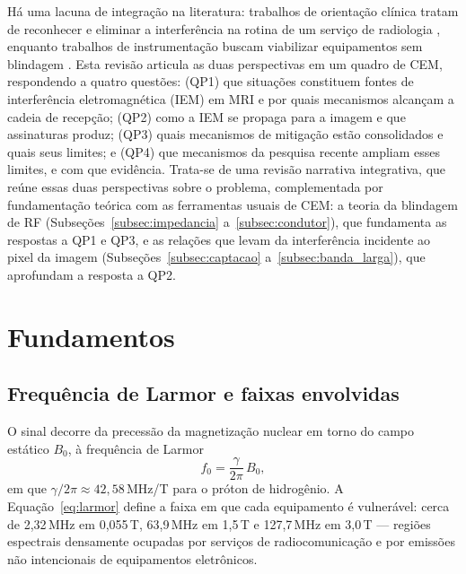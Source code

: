 \documentclass[portuguese]{sbcreviews-2025}%
\begin{document}
Há uma lacuna de integração na literatura: trabalhos de orientação clínica tratam de reconhecer e eliminar a interferência na rotina de um serviço de radiologia \citep{kwok2024rf}, enquanto trabalhos de instrumentação buscam viabilizar equipamentos sem blindagem \citep{zhao2024emi, srinivas2022editer}. Esta revisão articula as duas perspectivas em um quadro de CEM, respondendo a quatro questões: (QP1) que situações constituem fontes de interferência eletromagnética (IEM) em MRI e por quais mecanismos alcançam a cadeia de recepção; (QP2) como a IEM se propaga para a imagem e que assinaturas produz; (QP3) quais mecanismos de mitigação estão consolidados e quais seus limites; e (QP4) que mecanismos da pesquisa recente ampliam esses limites, e com que evidência. Trata-se de uma revisão narrativa integrativa, que reúne essas duas perspectivas sobre o problema, complementada por fundamentação teórica com as ferramentas usuais de CEM: a teoria da blindagem de RF (Subseções~\ref{subsec:impedancia} a~\ref{subsec:condutor}), que fundamenta as respostas a QP1 e QP3, e as relações que levam da interferência incidente ao pixel da imagem (Subseções~\ref{subsec:captacao} a~\ref{subsec:banda_larga}), que aprofundam a resposta a QP2.

\section{Fundamentos}
\label{sec:fundamentos}

\subsection{Frequência de Larmor e faixas envolvidas}
\label{subsec:larmor}

O sinal decorre da precessão da magnetização nuclear em torno do campo estático $B_0$, à frequência de Larmor
\begin{equation}
f_0 = \frac{\gamma}{2\pi}\,B_0 ,
\label{eq:larmor}
\end{equation}
em que $\gamma/2\pi \approx 42{,}58$\,MHz/T para o próton de hidrogênio. A Equação~\eqref{eq:larmor} define a faixa em que cada equipamento é vulnerável: cerca de 2,32\,MHz em 0,055\,T, 63,9\,MHz em 1,5\,T \citep{zhao2024emi} e 127,7\,MHz em 3,0\,T --- regiões espectrais densamente ocupadas por serviços de radiocomunicação e por emissões não intencionais de equipamentos eletrônicos.
\end{document}
